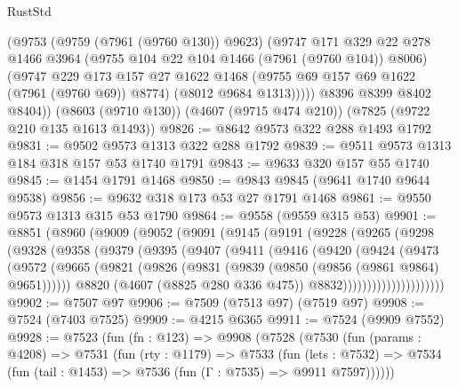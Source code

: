 \begin{lexlean}{RustStd}
\begin{coremodule}
          (@9753
            (@9759 (@7961 (@9760 @130)) @9623)
            (@9747
              @171
              @329
              @22
              @278
              @1466
              @3964
              (@9755 @104 @22 @104 @1466 (@7961 (@9760 @104)) @8006)
              (@9747
                @229
                @173
                @157
                @27
                @1622
                @1468
                (@9755 @69 @157 @69 @1622 (@7961 (@9760 @69)) @8774)
                (@8012 @9684 @1313)))))
        @8396
        @8399
        @8402
        @8404))
    (@8603 (@9710 @130))
    (@4607 (@9715 @474 @210))
    (@7825 (@9722 @210 @135 @1613 @1493))
@9826 := @8642 @9573 @322 @288 @1493 @1792
@9831 := @9502 @9573 @1313 @322 @288 @1792
@9839 := @9511 @9573 @1313 @184 @318 @157 @53 @1740 @1791
@9843 := @9633 @320 @157 @55 @1740
@9845 := @1454 @1791 @1468
@9850 := @9843 @9845 (@9641 @1740 @9644 @9538)
@9856 := @9632 @318 @173 @53 @27 @1791 @1468
@9861 := @9550 @9573 @1313 @315 @53 @1790
@9864 := @9558 (@9559 @315 @53)
@9901 := @8851
    (@8960
      (@9009
        (@9052
          (@9091
            (@9145
              (@9191
                (@9228
                  (@9265
                    (@9298
                      (@9328
                        (@9358
                          (@9379
                            (@9395
                              (@9407
                                (@9411
                                  (@9416
                                    (@9420
                                      (@9424
                                        (@9473
                                          (@9572
                                            (@9665
                                              (@9821
                                                (@9826
                                                  (@9831
                                                    (@9839 (@9850 (@9856 (@9861 @9864) @9651))))))
                                              @8820
                                              (@4607 (@8825 @280 @336 @475))
                                              @8832)))))))))))))))))))))
@9902 := @7507 @97
@9906 := @7509 (@7513 @97) (@7519 @97)
@9908 := @7524 (@7403 @7525)
@9909 := @4215 @6365
@9911 := @7524 (@9909 @7552)
@9928 := @7523
    (fun (fn : @123) =>
    @9908
      (@7528
        (@7530
          (fun (params : @4208) =>
          @7531
            (fun (rty : @1179) =>
            @7533
              (fun (lets : @7532) =>
              @7534 (fun (tail : @1453) => @7536 (fun (Γ : @7535) => @9911 @7597))))))

\end{coremodule}
\end{lexlean}
